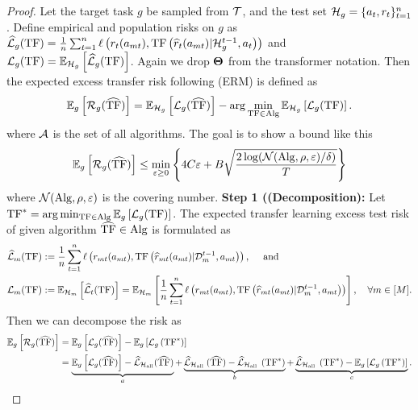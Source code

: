 \documentclass[10pt]{article}
\theoremstyle{plain}
\theoremstyle{definition}
\theoremstyle{remark}
\begin{document}
\begin{proof}
Let the target task $g$ be sampled from $\mathcal{T}$, and the test set $\mathcal{H}_{g} = \{a_t, r_t\}_{t=1}^n$. Define empirical and population risks on $g$ as $\widehat{\mathcal{L}}_{g}(\mathrm{TF})=\frac{1}{n} \sum_{t=1}^n \ell\left(r_t(a_{mt}), \mathrm{TF}\left(\widehat{r}_t(a_{mt})|\mathcal{H}_{g}^{t-1}, a_t\right)\right)$ and $\mathcal{L}_{g}(\mathrm{TF})=\mathbb{E}_{\mathcal{H}_{g}}\left[\widehat{\mathcal{L}}_{g}(\mathrm{TF})\right]$. Again we drop $\mathbf{\Theta}$ from the transformer notation. Then the expected excess transfer risk following (ERM) is defined as
\begin{align}
\mathbb{E}_{g}\left[\mathcal{R}_{g}(\widehat{\mathrm{TF}})\right]=\mathbb{E}_{\mathcal{H}_{g}}\left[\mathcal{L}_{g}(\widehat{\mathrm{TF}})\right]-\arg \min _{\mathrm{TF} \in \mathrm{Alg}} \mathbb{E}_{\mathcal{H}_{g}}\left[\mathcal{L}_{g}(\mathrm{TF})\right] . \label{eq:exces-transfer-risk}
\end{align}
where $\mathcal{A}$ is the set of all algorithms. The goal is to show a bound like this
\begin{align*}
\mathbb{E}_{g}\left[\mathcal{R}_{g}(\widehat{\mathrm{TF}})\right] \leq \min _{\varepsilon \geq 0}\left\{4 C \varepsilon+B \sqrt{\frac{2 \log (\mathcal{N}(\mathrm{Alg}, \rho, \varepsilon) / \delta)}{T}}\right\}
\end{align*}
where $\mathcal{N}(\mathrm{Alg}, \rho, \varepsilon)$ is the covering number.
\textbf{Step 1 (\textbf{(Decomposition)}:} Let $\mathrm{TF}^*=\arg \min _{\mathrm{TF} \in \mathrm{Alg}} \mathbb{E}_{g}\left[\mathcal{L}_{g}(\mathrm{TF})\right]$. The expected transfer learning excess test risk of given algorithm $\widehat{\mathrm{TF}} \in \mathrm{Alg}$ is formulated as
\begin{align*}
& \widehat{\mathcal{L}}_m(\mathrm{TF}):=\frac{1}{n} \sum_{t=1}^n \ell\left(r_{m t}(a_{mt}), \mathrm{TF}\left(\widehat{r}_{m t}(a_{mt})| \mathcal{D}_m^{t-1}, a_{m t}\right)\right), \quad \text { and } \\
& \mathcal{L}_m(\mathrm{TF}):=\mathbb{E}_{\mathcal{H}_m}\left[\widehat{\mathcal{L}}_t(\mathrm{TF})\right]=\mathbb{E}_{\mathcal{H}_m}\left[\frac{1}{n} \sum_{t=1}^n \ell\left(r_{m t}(a_{mt}), \mathrm{TF}\left(\widehat{r}_{m t}(a_{mt})| \mathcal{D}_m^{t-1}, a_{m t}\right)\right)\right], \quad \forall m \in[M] .
\end{align*}
Then we can decompose the risk as
\begin{align*}
\mathbb{E}_{g}\left[\mathcal{R}_{g}(\widehat{\T})\right] &=\mathbb{E}_{g}\left[\L_{g}(\widehat{\T})\right]-\mathbb{E}_{g}\left[\L_{g}\left(\T^*\right)\right]\\
& =
\underbrace{\mathbb{E}_{g}\left[\L_{g}(\widehat{\T})\right]-\widehat{\L}_{\H_{\mathrm{all}}}(\widehat{\T})}_a + \underbrace{\widehat{\L}_{\H_{\text {all }}}(\widehat{\T})-\widehat{\L}_{\H_{\text {all }}}\left(\T^*\right)}_b +\underbrace{\widehat{\L}_{\H_{\text {all }}}\left(\T^*\right)-\mathbb{E}_{g}\left[\L_{g}\left(\T^*\right)\right]}_c .

\end{align*}
\end{proof}
\end{document}
